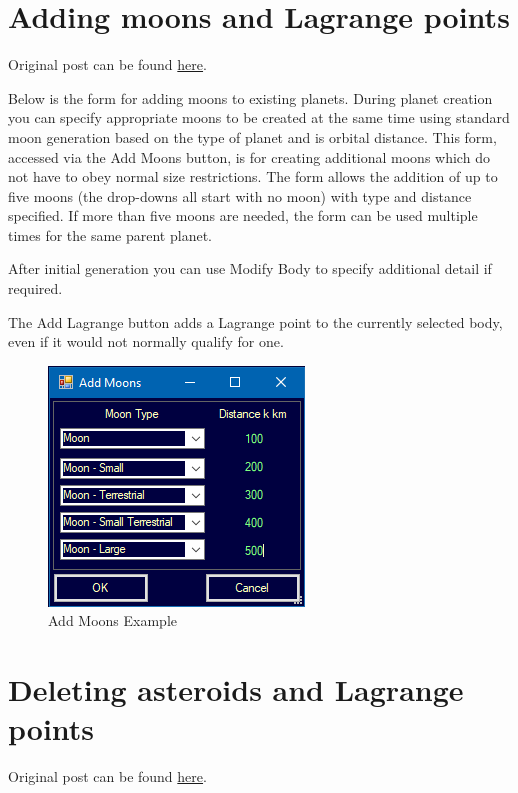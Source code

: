 \documentclass[../Aurora C# unofficial manual.tex]{subfiles}
\begin{document}
	
	\section{Adding moons and Lagrange points}\label{6_adding_moons_and_lagrange}
	Original post can be found
	\href{http://aurora2.pentarch.org/index.php?topic=8495.msg118787#msg118787}{here}.
	\newline\newline
	
	Below is the form for adding moons to existing planets. During planet creation you can specify appropriate moons to be created at the same time using standard moon generation based on the type of planet and is orbital distance. This form, accessed via the Add Moons button, is for creating additional moons which do not have to obey normal size restrictions. The form allows the addition of up to five moons (the drop-downs all start with no moon) with type and distance specified. If more than five moons are needed, the form can be used multiple times for the same parent planet.
	
	After initial generation you can use Modify Body to specify additional detail if required.
	
	The Add Lagrange button adds a Lagrange point to the currently selected body, even if it would not normally qualify for one.
	\begin{figure}[H]
		\centering
		\includegraphics[width=0.5\linewidth]{images/AddMoons}
		\caption[Add Moons Example]{Add Moons Example}
		\label{fig:addmoons}
	\end{figure}
	
	
	\section{Deleting asteroids and Lagrange points}\label{7_deleting asteroids_and_lagrange}
	Original post can be found
	\href{http://aurora2.pentarch.org/index.php?topic=8495.msg118803#msg118803}{here}.
	\newline\newline
	
\end{document}
